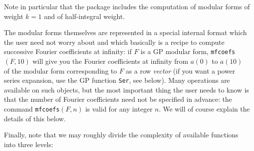 \documentclass[11pt]{article}
\def\kbd#1{{\tt #1}}
\begin{document}
Note in particular that the package includes the computation of modular
forms of weight $k=1$ and of half-integral weight.

\medskip

The modular forms themselves are represented in a special internal format
which the user need not worry about and which basically is a recipe to
compute successive Fourier coefficients at infinity: if $F$ is a GP modular
form, \kbd{mfcoefs}$(F, 10)$ will give you the Fourier coefficients at infinity
from $a(0)$ to $a(10)$ of the modular form corresponding to $F$ as a row
\emph{vector} (if you want a power series expansion, use the GP function
\kbd{Ser}, see below). Many operations are available on such objects, but the
most important thing the user needs to know is that the number of Fourier
coefficients need not be specified in advance: the command
\kbd{mfcoefs}$(F,n)$ is valid for any integer $n$. We will of course explain
the details of this below.

\medskip

Finally, note that we may roughly divide the complexity of available functions
into three levels:
\end{document}
